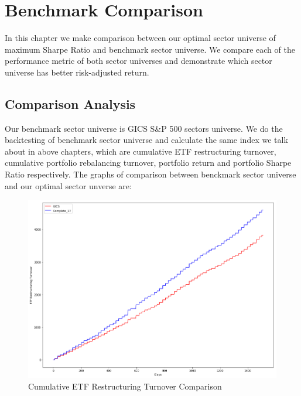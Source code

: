 \documentclass[../main.tex]{subfiles}
\begin{document}
    
\chapter{Benchmark Comparison}

In this chapter we make comparison between our optimal sector universe of maximum Sharpe Ratio and benchmark sector universe. We compare each of the performance metric of both sector universes and demonstrate which sector universe has better risk-adjusted return.  

\section{Comparison Analysis}

Our benchmark sector universe is GICS S\&P 500 sectors universe. We do the backtesting of benchmark sector universe and calculate the same index we talk about in above chapters, which are cumulative ETF restructuring turnover, cumulative portfolio rebalancing turnover, portfolio return and portfolio Sharpe Ratio  respectively. The graphs of comparison between benckmark sector universe and our optimal sector unverse are: 

\begin{figure}[H]
    \centering
    \includegraphics[scale=0.4]{images/etf_restrut_compare.png}
    \caption{Cumulative ETF Restructuring Turnover Comparison}
    \label{fig:benchmark_comparison:restrut_turnover_comparison}
\end{figure} 
\end{document}
